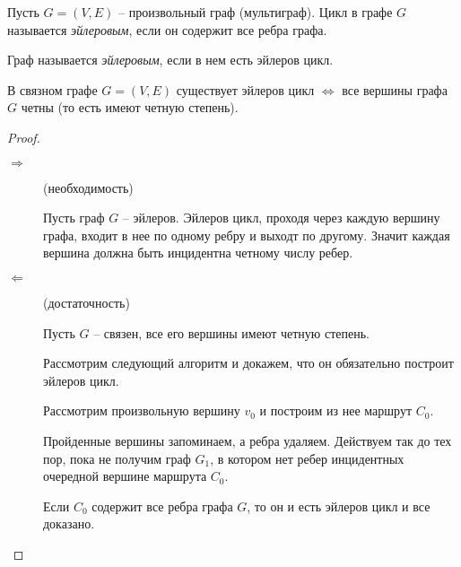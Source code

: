 \begin{definition}
    Пусть $ G = (V,E) $ -- произвольный граф (мультиграф). Цикл в графе $ G $ называется \emph{эйлеровым}, если он содержит все ребра графа.
\end{definition}

\begin{definition}
    Граф называется \emph{эйлеровым}, если в нем есть эйлеров цикл.
\end{definition}

\begin{theorem}[Эйлер, 1736]
    В связном графе $ G = (V,E) $ существует эйлеров цикл $ \iff $ все вершины графа $ G $ четны (то есть имеют четную степень).
\end{theorem}

\begin{proof}\leavevmode
    \begin{description}
        \item[$ \boxed{\Rightarrow} $] (необходимость)

              Пусть граф $ G $ -- эйлеров. Эйлеров цикл, проходя через каждую вершину графа, входит в нее по одному ребру и выходт по другому. Значит каждая вершина должна быть инцидентна четному числу ребер.

        \item[$ \boxed{\Leftarrow} $] (достаточность)

              Пусть $ G $ -- связен, все его вершины имеют четную степень.

              Рассмотрим следующий алгоритм и докажем, что он обязательно построит эйлеров цикл.

              \begin{note}
                  Рассмотрим произвольную вершину $ v_0 $ и построим из нее маршрут $ C_0 $.

                  Пройденные вершины запоминаем, а ребра удаляем. Действуем так до тех пор, пока не получим граф $ G_1 $, в котором нет ребер инцидентных очередной вершине маршрута $ C_0 $.
                  \begin{figure}[H]
                      \centering
                      \label{fig:fig_09}
                  \end{figure}

                  Если $ C_0 $ содержит все ребра графа $ G $, то он и есть эйлеров цикл и все доказано.


\end{note}
\end{description}
\end{proof}
